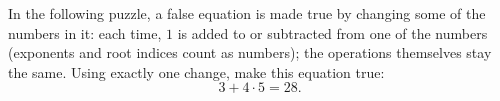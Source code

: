 In the following puzzle, a false equation is made true by changing some of the numbers in it: each time, $1$ is added to or subtracted from one of the numbers (exponents and root indices count as numbers); the operations themselves stay the same. Using exactly one change, make this equation true:
\[3+4\cdot5=28.\]
